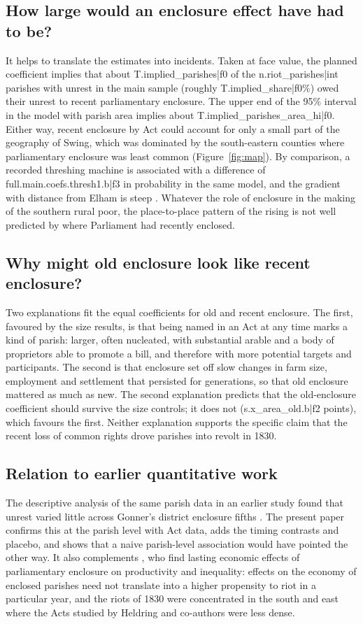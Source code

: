 \documentclass[11pt,a4paper]{article}
\begin{document}
\subsection{How large would an enclosure effect have had to be?}
It helps to translate the estimates into incidents. Taken at face value, the planned coefficient implies that about {{T.implied_parishes|f0}} of the {{n.riot_parishes|int}} parishes with unrest in the main sample (roughly {{T.implied_share|f0}}\%) owed their unrest to recent parliamentary enclosure. The upper end of the 95\% interval in the model with parish area implies about {{T.implied_parishes_area_hi|f0}}. Either way, recent enclosure by Act could account for only a small part of the geography of Swing, which was dominated by the south-eastern counties where parliamentary enclosure was least common (Figure~\ref{fig:map}). By comparison, a recorded threshing machine is associated with a difference of {{full.main.coefs.thresh1.b|f3}} in probability in the same model, and the gradient with distance from Elham is steep \citep{caprettinivoth2020}. Whatever the role of enclosure in the making of the southern rural poor, the place-to-place pattern of the rising is not well predicted by where Parliament had recently enclosed.

\subsection{Why might old enclosure look like recent enclosure?}
Two explanations fit the equal coefficients for old and recent enclosure. The first, favoured by the size results, is that being named in an Act at any time marks a kind of parish: larger, often nucleated, with substantial arable and a body of proprietors able to promote a bill, and therefore with more potential targets and participants. The second is that enclosure set off slow changes in farm size, employment and settlement that persisted for generations, so that old enclosure mattered as much as new. The second explanation predicts that the old-enclosure coefficient should survive the size controls; it does not ({{s.x_area_old.b|f2}} points), which favours the first. Neither explanation supports the specific claim that the recent loss of common rights drove parishes into revolt in 1830.

\subsection{Relation to earlier quantitative work}
The descriptive analysis of the same parish data in an earlier study found that unrest varied little across Gonner's district enclosure fifths \citep{hotham2026swing}. The present paper confirms this at the parish level with Act data, adds the timing contrasts and placebo, and shows that a naive parish-level association would have pointed the other way. It also complements \citet{heldring2022}, who find lasting economic effects of parliamentary enclosure on productivity and inequality: effects on the economy of enclosed parishes need not translate into a higher propensity to riot in a particular year, and the riots of 1830 were concentrated in the south and east where the Acts studied by Heldring and co-authors were less dense.
\end{document}

